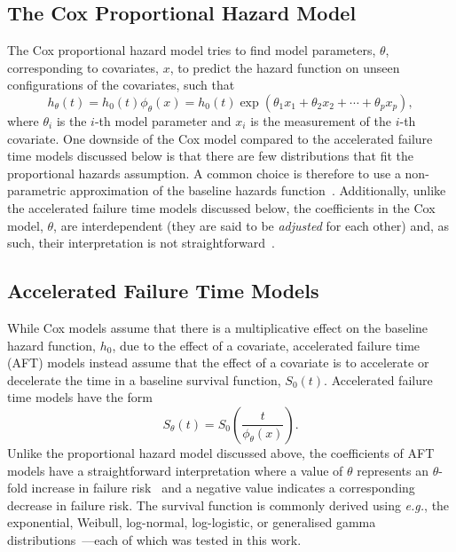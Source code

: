 \subsection{The Cox Proportional Hazard Model}
The Cox proportional hazard model tries to find model parameters, $\theta$, corresponding to covariates, $x$, to predict the hazard function on unseen configurations of the covariates, such that
\[
    h_\theta(t) = h_0(t)\phi_\theta(x) = h_0(t) \exp(\theta_1 x_1 + \theta_2 x_2 + \cdots + \theta_p x_p),
\]
where $\theta_i$ is the $i$-th model parameter and $x_i$ is the measurement of the $i$-th covariate. One downside of the Cox model compared to the accelerated failure time models discussed below is that there are few distributions that fit the proportional hazards assumption. A common choice is therefore to use a non-parametric approximation of the baseline hazards function~\cite{collett2023modelling}.
Additionally, unlike the accelerated failure time models discussed below, the coefficients in the Cox model, $\theta$, are interdependent (they are said to be \textit{adjusted} for each other) and, as such, their interpretation is not straightforward~\cite{collett2023modelling}.

\subsection{Accelerated Failure Time Models}
While Cox models assume that there is a multiplicative effect on the baseline hazard function, $h_0$, due to the effect of a covariate, accelerated failure time (AFT) models instead assume that the effect of a covariate is to accelerate or decelerate the time in a baseline survival function, $S_0(t)$.
Accelerated failure time models have the form
\begin{equation} \label{eq:def_aft_model}
	S_\theta(t) = S_0 \left( \frac{t}{\phi_\theta(x)} \right).
\end{equation}
Unlike the proportional hazard model discussed above, the coefficients of AFT models have a straightforward interpretation where a value of $\theta$ represents an $\theta$-fold increase in failure risk~\cite{collett2023modelling} and a negative value indicates a corresponding decrease in failure risk.
The survival function is commonly derived using \textit{e.g.},
the exponential, Weibull, log-normal, log-logistic, or generalised gamma distributions~\cite{collett2023modelling}---each of which was tested in this work.

